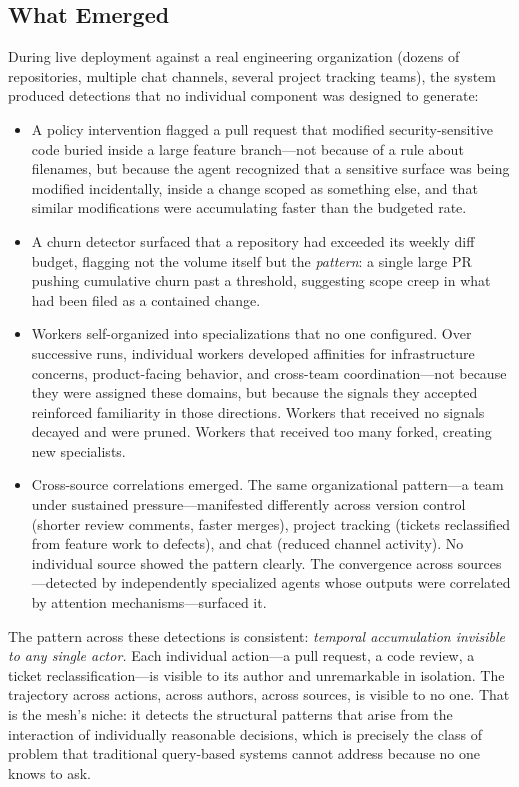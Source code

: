 \documentclass[11pt,twocolumn]{article}
\begin{document}
\subsection{What Emerged}

During live deployment against a real engineering organization
(dozens of repositories, multiple chat channels, several project
tracking teams), the system produced detections that no individual
component was designed to generate:

\begin{itemize}[nosep]
  \item A policy intervention flagged a pull request that modified
    security-sensitive code buried inside a large feature branch---not
    because of a rule about filenames, but because the agent recognized
    that a sensitive surface was being modified incidentally, inside a
    change scoped as something else, and that similar modifications
    were accumulating faster than the budgeted rate.
  \item A churn detector surfaced that a repository had exceeded its
    weekly diff budget, flagging not the volume itself but the
    \emph{pattern}: a single large PR pushing cumulative churn past a
    threshold, suggesting scope creep in what had been filed as a
    contained change.
  \item Workers self-organized into specializations that no one
    configured.  Over successive runs, individual workers developed
    affinities for infrastructure concerns, product-facing behavior,
    and cross-team coordination---not because they were assigned these
    domains, but because the signals they accepted reinforced
    familiarity in those directions.  Workers that received no signals
    decayed and were pruned.  Workers that received too many forked,
    creating new specialists.
  \item Cross-source correlations emerged.  The same organizational
    pattern---a team under sustained pressure---manifested differently
    across version control (shorter review comments, faster merges),
    project tracking (tickets reclassified from feature work to
    defects), and chat (reduced channel activity).  No individual
    source showed the pattern clearly.  The convergence across
    sources---detected by independently specialized agents whose
    outputs were correlated by attention mechanisms---surfaced it.
\end{itemize}

The pattern across these detections is consistent: \emph{temporal
accumulation invisible to any single actor.}  Each individual action---a
pull request, a code review, a ticket reclassification---is visible to
its author and unremarkable in isolation.  The trajectory across
actions, across authors, across sources, is visible to no one.  That is
the mesh's niche: it detects the structural patterns that arise from the
interaction of individually reasonable decisions, which is precisely the
class of problem that traditional query-based systems cannot address
because no one knows to ask.
\end{document}
